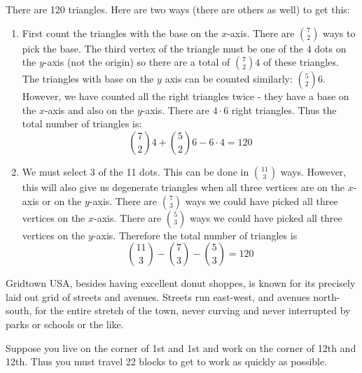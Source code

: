 \begin{questions}
\begin{center}
\end{center}

\begin{solution}
  There are 120 triangles.  Here are two ways (there are others as well) to get this:
  
  \begin{enumerate}
    \item First count the triangles with the base on the $x$-axis.  There are ${7 \choose 2}$ ways to pick the base.  The third vertex of the triangle must be one of the 4 dots on the $y$-axis (not the origin) so there are a total of ${7 \choose 2}4$ of these triangles.  The triangles with base on the $y$ axis can be counted similarly: ${5 \choose 2}6$.  However, we have counted all the right triangles twice - they have a base on the $x$-axis and also on the $y$-axis.  There are $4 \cdot 6$ right triangles.  Thus the total number of triangles is:
    \[{7 \choose 2}4 + {5 \choose 2}6 - 6\cdot 4 = 120\]
    \item We must select 3 of the 11 dots.  This can be done in ${11 \choose 3}$ ways.  However, this will also give us degenerate triangles when all three vertices are on the $x$-axis or on the $y$-axis.  There are ${7 \choose 3}$ ways we could have picked all three vertices on the $x$-axis.  There are ${5 \choose 3}$ ways we could have picked all three vertices on the $y$-axis.  Therefore the total number of triangles is
    \[{11 \choose 3} - {7 \choose 3} - {5 \choose 3} = 120\]
  \end{enumerate}

\end{solution}



\question[8] Gridtown USA, besides having excellent donut shoppes, is known for its precisely laid out grid of streets and avenues.  Streets run east-west, and avenues north-south, for the entire stretch of the town, never curving and never interrupted by parks or schools or the like.

Suppose you live on the corner of 1st and 1st and work on the corner of 12th and 12th.  Thus you must travel 22 blocks to get to work as quickly as possible.


\end{questions}
